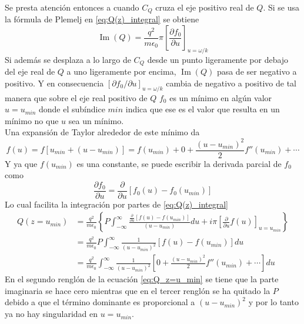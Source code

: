 \documentclass[../tesis_main_file.tex]{subfiles}
\begin{document}
Se presta atención entonces a cuando $C_Q$ cruza el eje positivo real de $Q$. Si se usa la fórmula de Plemelj en \ref{eq:Q(z)_integral} se obtiene
\begin{equation}
\operatorname{Im}(Q) = \frac{q^2}{m\epsilon _0}\pi \left[\frac{\partial f_0}{\partial u}\right]_{u= \omega /k}
\end{equation}
Si además se desplaza a lo largo de $C_Q$ desde un punto ligeramente por debajo del eje real de $Q$ a uno ligeramente por encima, $\operatorname{Im}(Q)$ pasa de ser negativo a positivo. Y en consecuencia $[\partial f_0 / \partial u]_{u = \omega /k}$ cambia de negativo a positivo de tal manera que sobre el eje real positivo de $Q$ $f_0$ es un mínimo en algún valor $u=u_{min}$ donde el subíndice $min$ indica que ese es el valor que resulta en un mínimo no que $u$ sea un mínimo.\\
Una expansión de Taylor alrededor de este mínimo da
\begin{equation}
\label{eq:taylor_min_Penrose}
f(u) =f[u_{min}+(u-u_{min})] = f(u_{min})+0+\frac{(u -u_{min})^2}{2}f''(u_{min})+ \cdots
\end{equation}
Y ya que $f(u_{min})$ es una constante, se puede escribir la derivada parcial de $f_0$ como
\begin{equation}
\frac{\partial f_0}{\partial u} = \frac{\partial}{\partial u}\left[f_0(u)-f_0(u_{min})\right]
\end{equation}
Lo cual facilita la integración por partes de \ref{eq:Q(z)_integral}
\begin{equation}
\label{eq:Q_z=u_min}
\begin{split}
Q\left( z=u_{min}\right) &=\frac{q^2}{m\epsilon _0}\left\lbrace P\int ^{\infty}_{-\infty} \frac{\frac{\partial}{\partial u}\left[f(u)-f(u_{min})\right]}{(u-u_{min})}du + i\pi \left[\frac{\partial}{\partial u}f(u)\right]_{u=u_{min}}\right\rbrace\\
&=\frac{q^2}{m\epsilon _0}P\int ^{\infty}_{-\infty} \frac{1}{(u-u_{min})^2}\left[ f(u)-f(u_{min})\right]du\\
&= \frac{q^2}{m\epsilon _0}\int ^{\infty}_{-\infty}\frac{1}{(u-u_{min})^2} \left[0+\frac{(u-u_{min})^2}{2}f''(u_{min})+\cdots \right]du
\end{split}
\end{equation}
En el segundo renglón de la ecuación \ref{eq:Q_z=u_min} se tiene que la parte imaginaria se hace cero  mientras que en el tercer renglón se ha quitado la $P$ debido a que el término dominante es proporcional a $(u-u_{min})^2$ y por lo tanto ya no hay singularidad en $u=u_{min}$.\\
\end{document}
